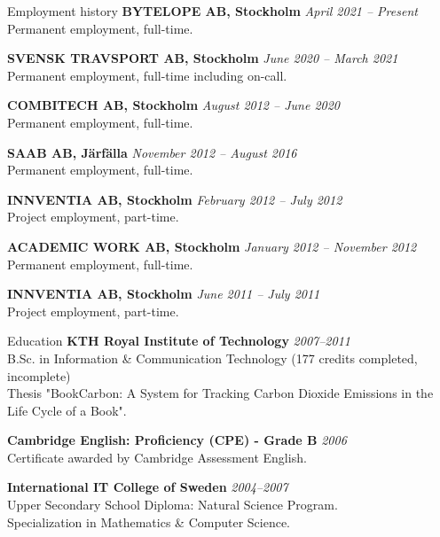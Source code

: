 \documentclass{resume}
\begin{document}
  \begin{rSection}{Employment history}
  {\bf BYTELOPE AB, Stockholm}
    \hfill {\em April 2021 -- Present } \\
    { Permanent employment, full-time. }

    {\bf SVENSK TRAVSPORT AB, Stockholm}
    \hfill {\em June 2020 -- March 2021 } \\
    { Permanent employment, full-time including on-call. }

    {\bf COMBITECH AB, Stockholm}
    \hfill {\em August 2012 -- June 2020 } \\
    { Permanent employment, full-time. }

    {\bf SAAB AB, Järfälla}
    \hfill {\em November 2012 -- August 2016 } \\
    { Permanent employment, full-time. }

    {\bf INNVENTIA AB, Stockholm}
    \hfill {\em February 2012 -- July 2012 } \\
    { Project employment, part-time. }

    {\bf ACADEMIC WORK AB, Stockholm}
    \hfill {\em January 2012 -- November 2012 } \\
    { Permanent employment, full-time. }

    {\bf INNVENTIA AB, Stockholm}
    \hfill {\em June 2011 -- July 2011 } \\
    { Project employment, part-time. }

  \end{rSection}

  \begin{rSection}{Education}
  {\bf KTH Royal Institute of Technology}
    \hfill {\em 2007--2011 } \\
    { B.Sc. in Information \& Communication Technology (177 credits completed, incomplete) } \\
    { Thesis "BookCarbon: A System for Tracking Carbon Dioxide Emissions in the Life Cycle of a Book". }

    {\bf Cambridge English: Proficiency (CPE) - Grade B}
    \hfill {\em 2006 } \\
    { Certificate awarded by Cambridge Assessment English. }

    {\bf International IT College of Sweden}
    \hfill {\em 2004--2007 } \\
    { Upper Secondary School Diploma: Natural Science Program. } \\
    { Specialization in Mathematics \& Computer Science. }
  \end{rSection}
\end{document}
